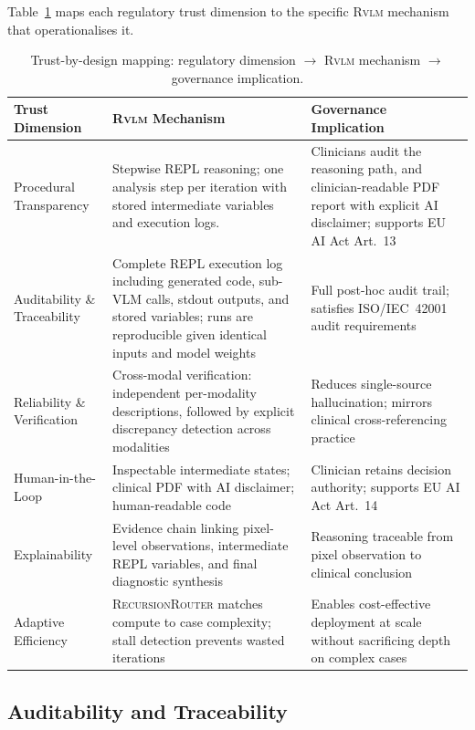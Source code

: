\documentclass{article}
\newcommand{\RVLM}{\textsc{Rvlm}}
\newcommand{\RRouter}{\textsc{RecursionRouter}}
\begin{document}
	Table~\ref{tab:trust} maps each regulatory trust dimension to the specific
	\RVLM{} mechanism that operationalises it.
	
	\begin{table}[h]
		\centering
		\caption{Trust-by-design mapping: regulatory dimension $\rightarrow$
			\RVLM{} mechanism $\rightarrow$ governance implication.}
		\label{tab:trust}
		\small
		\begin{tabular}{p{2.4cm}p{4.4cm}p{4.6cm}}
			\toprule
			\textbf{Trust Dimension} & \textbf{\RVLM{} Mechanism} &
			\textbf{Governance Implication} \\
			\midrule
			Procedural Transparency
			& Stepwise REPL reasoning; one analysis step per iteration with stored intermediate variables and execution logs.
			& Clinicians audit the reasoning path, and clinician-readable PDF report with explicit AI disclaimer; supports EU AI Act Art.~13 \\
			\addlinespace
			Auditability \& Traceability
			&Complete REPL execution log including generated code, sub-VLM calls, stdout outputs, and stored variables; runs are reproducible given identical inputs and model weights
			& Full post-hoc audit trail; satisfies ISO/IEC~42001
			audit requirements \\
			\addlinespace
			Reliability \& Verification
			& Cross-modal verification: independent per-modality
			descriptions, followed by explicit discrepancy detection across modalities
			& Reduces single-source hallucination; mirrors clinical
			cross-referencing practice \\
			\addlinespace
			Human-in-the-Loop
			& Inspectable intermediate states; clinical PDF with AI
			disclaimer; human-readable code
			& Clinician retains decision authority; supports EU AI
			Act Art.~14 \\
			\addlinespace
			Explainability
			& Evidence chain linking pixel-level observations, intermediate REPL variables, and final diagnostic synthesis
			& Reasoning traceable from pixel observation to clinical
			conclusion \\
			\addlinespace
			Adaptive Efficiency
			& \RRouter{} matches compute to case complexity; stall
			detection prevents wasted iterations
			& Enables cost-effective deployment at scale without
			sacrificing depth on complex cases \\
			\bottomrule
		\end{tabular}
	\end{table}
	
	\subsection{Auditability and Traceability}
	
\end{document}
